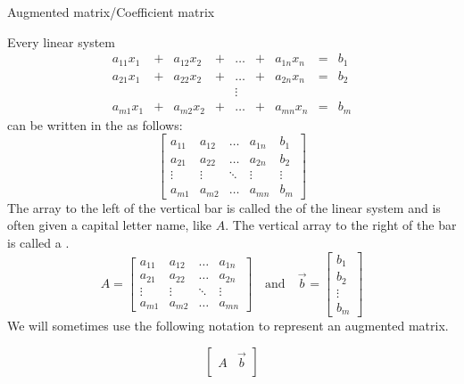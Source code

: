 \documentclass{ximera}
\begin{document}
Augmented matrix/Coefficient matrix
\begin{expandable}
    Every linear system 
$$\begin{array}{ccccccccc}
      a_{11}x_1 &+ &a_{12}x_2&+&\ldots&+&a_{1n}x_n&= &b_1 \\
	 a_{21}x_1 &+ &a_{22}x_2&+&\ldots&+&a_{2n}x_n&= &b_2 \\
     &&&&\vdots&&&& \\
     a_{m1}x_1 &+ &a_{m2}x_2&+&\ldots&+&a_{mn}x_n&= &b_m
    \end{array}$$
    can be written in the  as follows:
    $$\left[\begin{array}{cccc|c}  
 a_{11}&a_{12}&\ldots&a_{1n}&b_1\\a_{21}&a_{22}&\ldots&a_{2n}&b_2\\\vdots&\vdots&\ddots&\vdots&\vdots\\a_{m1}&a_{m2}&\ldots&a_{mn}&b_m
 \end{array}\right]$$
 The array to the left of the vertical bar is called the  of the linear system and is often given a capital letter name, like $A$.  The vertical array to the right of the bar is called a .
 $$A=\begin{bmatrix}a_{11}&a_{12}&\ldots&a_{1n}\\a_{21}&a_{22}&\ldots&a_{2n}\\\vdots&\vdots&\ddots&\vdots\\a_{m1}&a_{m2}&\ldots&a_{mn}\end{bmatrix}\quad\text{and}\quad\vec{b}=\begin{bmatrix}b_1\\b_2\\\vdots\\b_m\end{bmatrix}$$
We will sometimes use the following notation to represent an augmented matrix.

$$\left[\begin{array}{c|c}  
 A & \vec{b}\\
 \end{array}\right]$$
\end{expandable}

\begin{center}
\end{center}
\end{document}
